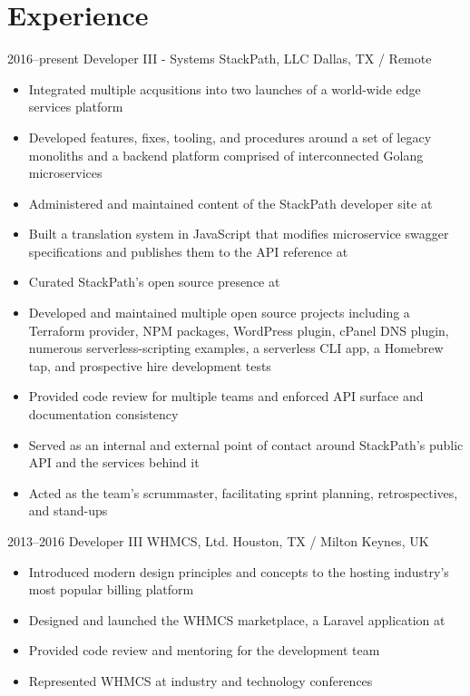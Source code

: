 \documentclass[11pt,a4paper,sans]{moderncv}
\begin{document}
  \section{Experience}
    \cventry
      {2016--present}
      {Developer III - Systems}
      {StackPath, LLC}
      {Dallas, TX / Remote}
      {}
      {
        \begin{itemize}
          \item Integrated multiple acqusitions into two launches of a world-wide edge services platform
          \item Developed features, fixes, tooling, and procedures around a set of legacy monoliths and a backend platform comprised of interconnected Golang microservices
          \item Administered and maintained content of the StackPath developer site at 
          \item Built a translation system in JavaScript that modifies microservice swagger specifications and publishes them to the API reference at 
          \item Curated StackPath's open source presence at 
          \item Developed and maintained multiple open source projects including a Terraform provider, NPM packages, WordPress plugin, cPanel DNS plugin, numerous serverless-scripting examples, a serverless CLI app, a Homebrew tap, and prospective hire development tests
          \item Provided code review for multiple teams and enforced API surface and documentation consistency
          \item Served as an internal and external point of contact around StackPath's public API and the services behind it
          \item Acted as the team's scrummaster, facilitating sprint planning, retrospectives, and stand-ups
        \end{itemize}
      }

    \cventry
      {2013--2016}
      {Developer III}
      {WHMCS, Ltd.}
      {Houston, TX / Milton Keynes, UK}
      {}
      {
        \begin{itemize}
          \item Introduced modern design principles and concepts to the hosting industry's most popular billing platform
          \item Designed and launched the WHMCS marketplace, a Laravel application at 
          \item Provided code review and mentoring for the development team
          \item Represented WHMCS at industry and technology conferences
        \end{itemize}
      }
\end{document}
